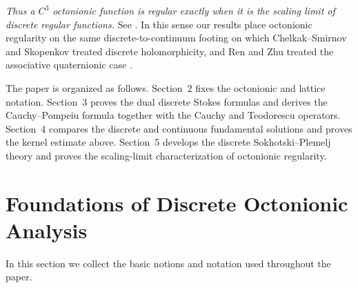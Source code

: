 \documentclass{amsart}
\theoremstyle{definition}
\theoremstyle{remark}
\numberwithin{equation}{section}
\begin{document}
\emph{Thus a $C^3$ octonionic function is regular exactly when it is the scaling limit of discrete regular functions.} See . In this sense our results place octonionic regularity on the same discrete-to-continuum footing on which Chelkak--Smirnov and Skopenkov treated discrete holomorphicity, and Ren and Zhu treated the associative quaternionic case \cite{CS2011,Sk,RZ2017,RZ2022}.

The paper is organized as follows. Section~2 fixes the octonionic and lattice notation. Section~3 proves the dual discrete Stokes formulas and derives the Cauchy--Pompeiu formula together with the Cauchy and Teodorescu operators. Section~4 compares the discrete and continuous fundamental solutions and proves the kernel estimate above. Section~5 develops the discrete Sokhotski--Plemelj theory and proves the scaling-limit characterization of octonionic regularity.

\section{Foundations of Discrete Octonionic Analysis}

In this section we collect the basic notions and notation used throughout the paper.
\end{document}
